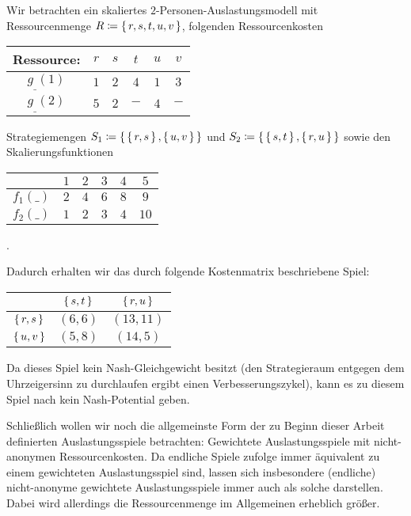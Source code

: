 \begin{bsp}\label{bsp:NichtSingeltonSkalAusl}
	Wir betrachten ein skaliertes $2$-Personen-Auslastungsmodell mit Ressourcenmenge $R \coloneqq \set{r, s, t, u, v}$, folgenden Ressourcenkosten
	\begin{center}\begin{tabular}{c|ccccc}
		Ressource:	& $r$ 	& $s$	& $t$	& $u$	& $v$	\\\hline\hline
		$g_{\_}(1)$	& $1$	& $2$	& $4$	& $1$	& $3$	\\\hline
		$g_{\_}(2)$	& $5$	& $2$ 	& $-$	& $4$	& $-$
	\end{tabular}\end{center}
	Strategiemengen $S_1 \coloneqq \set{\set{r,s}, \set{u,v}}$ und $S_2 \coloneqq \set{\set{s,t}, \set{r,u}}$ sowie den Skalierungsfunktionen
	\begin{center}\begin{tabular}{c|ccccc}
						& $1$ 	& $2$	& $3$	& $4$	& $5$	\\\hline\hline
			$f_1(\_)$	& $2$	& $4$	& $6$	& $8$	& $9$	\\\hline
			$f_2(\_)$	& $1$	& $2$ 	& $3$	& $4$	& $10$
	\end{tabular}.\end{center}
	Dadurch erhalten wir das durch folgende Kostenmatrix beschriebene Spiel:	
		\begin{center}\begin{tabular}{c||c|c}
						& $\set{s,t}$	& $\set{r,u}$	\\\hline\hline
			$\set{r,s}$	& $(6,6)$		& $(13,11)$		\\\hline
			$\set{u,v}$	& $(5,8)$		& $(14,5)$ 
		\end{tabular}\end{center}
	Da dieses Spiel kein Nash-Gleichgewicht besitzt (den Strategieraum entgegen dem Uhrzeigersinn zu durchlaufen ergibt einen Verbesserungszykel), kann es zu diesem Spiel nach  kein Nash-Potential geben.
\end{bsp}

Schließlich wollen wir noch die allgemeinste Form der zu Beginn dieser Arbeit definierten Auslastungsspiele betrachten: Gewichtete Auslastungsspiele mit nicht-anonymen Ressourcenkosten. Da endliche Spiele  zufolge immer äquivalent zu einem gewichteten Auslastungsspiel sind, lassen sich insbesondere (endliche) nicht-anonyme gewichtete Auslastungsspiele immer auch als solche darstellen. Dabei wird allerdings die Ressourcenmenge im Allgemeinen erheblich größer. 

